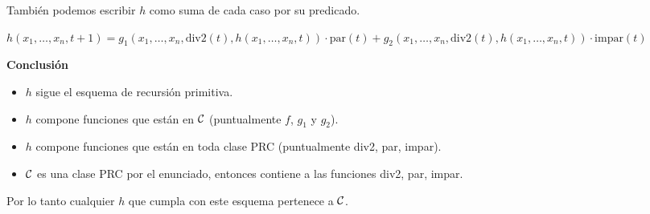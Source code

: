 También podemos escribir $h$ como suma de cada caso por su predicado.

$h(x_1, \dots, x_n, t + 1)
= g_1(x_1, \dots, x_n, \text{div2}(t), h(x_1, \dots, x_n, t)) \cdot \text{par}(t)
+ g_2(x_1, \dots, x_n, \text{div2}(t), h(x_1, \dots, x_n, t)) \cdot \text{impar}(t)$

\textbf{Conclusión}

\begin{itemize}
    \item $h$ sigue el esquema de recursión primitiva.
    \item $h$ compone funciones que están en $\mathcal{C}$ (puntualmente $f$, $g_1$ y $g_2$).
    \item $h$ compone funciones que están en toda clase PRC (puntualmente div2, par, impar).
    \item $\mathcal{C}$ es una clase PRC por el enunciado, entonces contiene a las funciones div2, par, impar.
\end{itemize}

Por lo tanto cualquier $h$ que cumpla con este esquema pertenece a $\mathcal{C}$.

